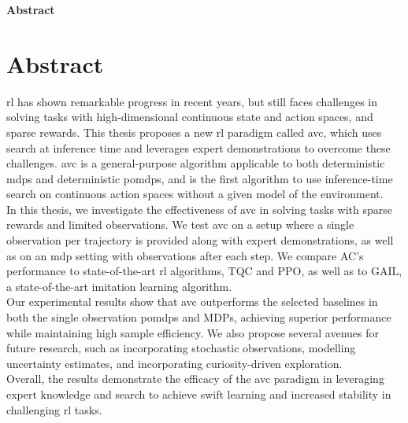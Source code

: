 \clearemptydoublepage
{}
{}

\vspace*{2cm}
\begin{center}
{\Large \textbf{Abstract}}
\end{center}
\vspace{1cm}

\chapter*{Abstract}
\label{chapter:Abstract}

\ac{rl} has shown remarkable progress in recent years, but still faces challenges in solving tasks with high-dimensional 
continuous state and action spaces, and sparse rewards. This thesis proposes a new \ac{rl} paradigm called \ac{avc}, which uses search at 
inference time and leverages expert demonstrations to overcome these challenges. \ac{avc} is a general-purpose algorithm applicable to both deterministic 
\ac{mdp}s and deterministic \ac{pomdp}s, and is the first algorithm to use inference-time search on continuous 
action spaces without a given model of the environment.\\

In this thesis, we investigate the effectiveness of \ac{avc} in solving tasks with sparse rewards and limited observations. We test \ac{avc} on 
a setup where a single observation per trajectory is provided along with expert demonstrations, as well as on an \ac{mdp} setting with observations 
after each step. We compare AC's performance to state-of-the-art \ac{rl} algorithms, TQC and PPO, as well as to GAIL, a state-of-the-art imitation 
learning algorithm. \\

Our experimental results show that \ac{avc} outperforms the selected baselines in both the single observation \ac{pomdp}s and MDPs, achieving superior 
performance while maintaining high sample efficiency. We also propose several avenues for future research, such as incorporating stochastic 
observations, modelling uncertainty estimates, and incorporating curiosity-driven exploration.\\

Overall, the results demonstrate the efficacy of the \ac{avc} paradigm in leveraging expert knowledge and search to achieve swift learning and 
increased stability in challenging \ac{rl} tasks.